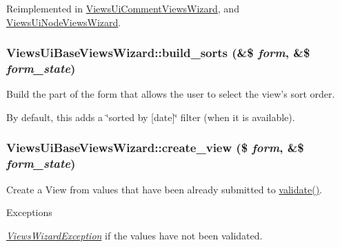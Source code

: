 Reimplemented in \hyperlink{classViewsUiCommentViewsWizard_aadb538fde884a2f60dc25abd7a3e01e1}{ViewsUiCommentViewsWizard}, and \hyperlink{classViewsUiNodeViewsWizard_a1c992c20ec060eddaba9b8e4ef76ef19}{ViewsUiNodeViewsWizard}.\hypertarget{classViewsUiBaseViewsWizard_ab6b0be6b141147b10dd10cf9eae59e0e}{
\subsubsection[{build\_\-sorts}]{\setlength{\rightskip}{0pt plus 5cm}ViewsUiBaseViewsWizard::build\_\-sorts (\&\$ {\em form}, \/  \&\$ {\em form\_\-state})}}
\label{classViewsUiBaseViewsWizard_ab6b0be6b141147b10dd10cf9eae59e0e}
Build the part of the form that allows the user to select the view's sort order.

By default, this adds a \char`\"{}sorted by \mbox{[}date\mbox{]}\char`\"{} filter (when it is available). \hypertarget{classViewsUiBaseViewsWizard_aef86de986b8438fc1b301d8413e69f00}{
\subsubsection[{create\_\-view}]{\setlength{\rightskip}{0pt plus 5cm}ViewsUiBaseViewsWizard::create\_\-view (\$ {\em form}, \/  \&\$ {\em form\_\-state})}}
\label{classViewsUiBaseViewsWizard_aef86de986b8438fc1b301d8413e69f00}
Create a View from values that have been already submitted to \hyperlink{classViewsUiBaseViewsWizard_a894ab06673721a26809f0a662241641b}{validate()}.


\begin{DoxyExceptions}{Exceptions}
\item[{\em \hyperlink{classViewsWizardException}{ViewsWizardException}}]if the values have not been validated. \end{DoxyExceptions}


